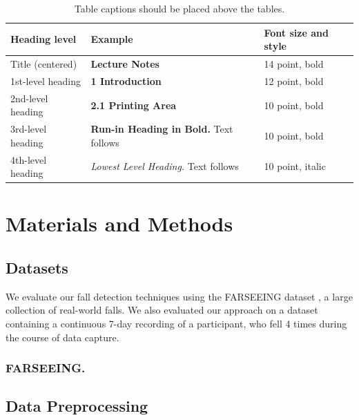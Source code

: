 \documentclass[runningheads]{llncs}
\begin{document}

\begin{table}[t]
\caption{Table captions should be placed above the
tables.}\label{tab1}
\begin{tabular}{lll}
\toprule
Heading level &  Example & Font size and style\\
\midrule
Title (centered) &  {\Large\bfseries Lecture Notes} & 14 point, bold\\
1st-level heading &  {\large\bfseries 1 Introduction} & 12 point, bold\\
2nd-level heading & {\bfseries 2.1 Printing Area} & 10 point, bold\\
3rd-level heading & {\bfseries Run-in Heading in Bold.} Text follows & 10 point, bold\\
4th-level heading & {\itshape Lowest Level Heading.} Text follows & 10 point, italic\\
\bottomrule
\end{tabular}
\end{table}

\section{Materials and Methods}

\subsection{Datasets}
We evaluate our fall detection techniques using the FARSEEING dataset \cite{klenk2016farseeing}, a large collection of real-world falls. We also evaluated our approach on a dataset containing a continuous 7-day recording of a participant, who fell 4 times during the course of data capture.

\subsubsection{FARSEEING.}

\subsection{Data Preprocessing}
\end{document}
